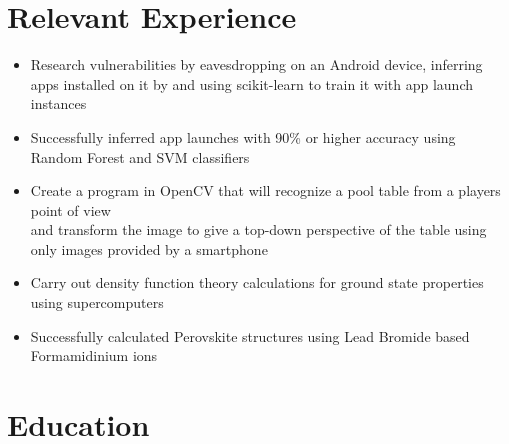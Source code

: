 \documentclass{Custom_CV}
\begin{document}
\section{Relevant Experience}
\begin{itemize}[rightmargin=\dimexpr\linewidth-15cm-\leftmargin\relax,noitemsep]
\item Research vulnerabilities by eavesdropping on an Android device, inferring apps installed on it by and using scikit-learn to train it with app launch instances
\item Successfully inferred app launches with 90\% or higher accuracy using Random Forest and SVM classifiers
\end{itemize}

\begin{itemize}[rightmargin=\dimexpr\linewidth-15cm-\leftmargin\relax,noitemsep]
\item Create a program in OpenCV that will recognize a pool table from a players point of view\\
and transform the image to give a top-down perspective of the table using only images provided by a smartphone
\end{itemize}

\begin{itemize}[rightmargin=\dimexpr\linewidth-15cm-\leftmargin\relax,noitemsep]
\item Carry out density function theory calculations for ground state properties using supercomputers
\item Successfully calculated Perovskite structures using Lead Bromide based Formamidinium ions
\end{itemize}

\section{Education}
\end{document}
